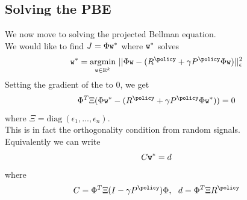 \subsection{Solving the PBE}
We now move to solving the projected Bellman equation.\\
We would like to find $J = \Phi \texttt{w}^*$ where $\texttt{w}^*$ solves
$$\weights^* = \underset{{\weights \in \mathbb{R}^k}}{\operatorname{argmin}} \ ||\FtrMtx \weights - (R^\policy+\gamma P^\policy\FtrMtx \weights)||_\epsilon^2$$
Setting the gradient of the to $0$, we get
$$\FtrMtx^T \Xi (\FtrMtx \weights^* - (R^\policy+\gamma P^\policy \FtrMtx \weights^*)) = 0$$
where $\Xi = \textrm{diag} \ (\epsilon_1,...,\epsilon_n)$.\\
This is in fact the orthogonality condition from random signals.\\
Equivalently we can write
$$C \texttt{w}^* = d$$
where
$$C = \FtrMtx^T \Xi(I-\gamma P^\policy) \FtrMtx, \ \ d = \FtrMtx^T\Xi R^\policy$$

